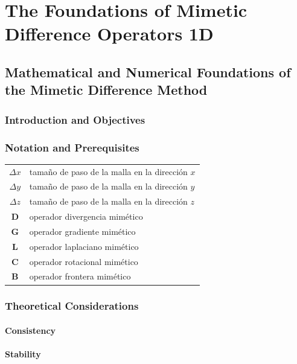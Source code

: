 \part{The Foundations of Mimetic Difference Operators 1D}

\chapter{Mathematical and Numerical Foundations of the Mimetic Difference Method}

\section{Introduction and Objectives}

\section{Notation and Prerequisites}

\begin{table}[ht!]
	\centering
	\begin{tabular}{cl}
		$\Delta x$  & tamaño de paso de la malla en la dirección $x$ \\
		$\Delta y$  & tamaño de paso de la malla en la dirección $y$ \\
		$\Delta z$  & tamaño de paso de la malla en la dirección $z$ \\
		$\symbf{D}$ & operador divergencia mimético                  \\
		$\symbf{G}$ & operador gradiente mimético                    \\
		$\symbf{L}$ & operador laplaciano mimético                   \\
		$\symbf{C}$ & operador rotacional mimético                   \\
		$\symbf{B}$ & operador frontera mimético
	\end{tabular}
\end{table}

\section{Theoretical Considerations}

\subsection{Consistency}

\subsection{Stability}

